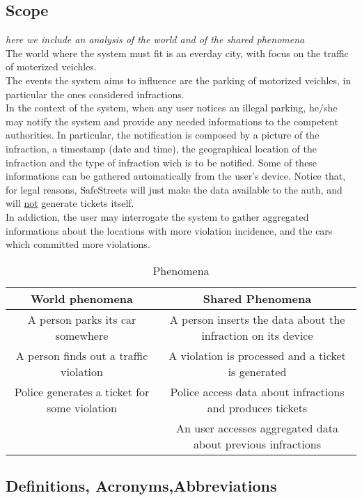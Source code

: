 \documentclass{article}
\begin{document}
	\subsection{Scope} \textit{here we include an analysis of the world and of the shared phenomena}\\
	The world where the system must fit is an everday city, with focus on the traffic of moterized veichles.\\
	The events the system aims to influence are the parking of motorized veichles,  in particular the ones considered infractions.\\
	In the context of the system, when any user notices an illegal parking, he/she may notify the system and provide any needed informations to the competent authorities. In particular, the notification is composed by a picture of the infraction, a timestamp (date and time), the geographical location of the infraction and the type of infraction wich is to be notified. Some of these informations can be gathered automatically from the user's device. Notice that, for legal reasons, SafeStreets will just make the data available to the auth, and will \underline{not} generate tickets itself. \\
	In addiction, the user may interrogate the system to gather aggregated informations about the locations with more violation incidence, and the cars which committed more violations. 
		\begin{table}[h]
			\begin{center}
				\caption{Phenomena}
				\small
				\label{Phenomena}
				\begin{tabular}{c|c}
					\textbf{World phenomena}&\textbf{Shared Phenomena}\\
					\hline
					A person parks its car somewhere&A person inserts the data about the infraction on its device\\
					A person finds out a traffic violation&A violation is processed and a ticket is generated\\
					Police generates a ticket for some violation&Police access data about infractions and produces tickets\\
					&An user accesses aggregated data about previous infractions
				\end{tabular}
			\end{center}
		\end{table}
	\subsection{Definitions, Acronyms,Abbreviations} \label{definitions}
\end{document}
